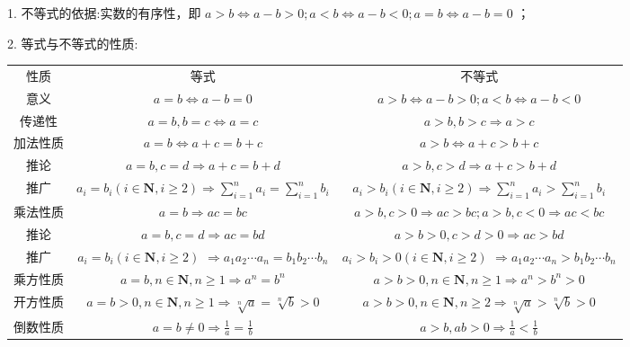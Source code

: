1. 不等式的依据:实数的有序性，即 $a > b \Leftrightarrow  a - b > 0;a < b \Leftrightarrow  a - b < 0;a = b \Leftrightarrow  a - b = 0$ ；

2. 等式与不等式的性质:

\begin{center}
\begin{tabular}{|c|c|c|}
\hline
性质 & 等式 & 不等式 \\
\cline{1-3}
意义 & $a = b \Leftrightarrow  a - b = 0$ & $a > b \Leftrightarrow  a - b > 0;a < b \Leftrightarrow  a - b < 0$ \\
\cline{1-3}
传递性 & $a = b,b = c \Leftrightarrow  a = c$ & $a > b,b > c \Rightarrow  a > c$ \\
\cline{1-3}
加法性质 & $a = b \Leftrightarrow  a + c = b + c$ & $a > b \Leftrightarrow  a + c > b + c$ \\
\cline{1-3}
推论 & $a = b,c = d \Rightarrow  a + c = b + d$ & $a > b,c > d \Rightarrow  a + c > b + d$ \\
\cline{1-3}
推广 & ${a}_{i} = {b}_{i}\left( {i \in  \mathbf{N},i \geq  2}\right)  \Rightarrow  \mathop{\sum }\limits_{{i = 1}}^{n}{a}_{i} = \mathop{\sum }\limits_{{i = 1}}^{n}{b}_{i}$ & ${a}_{i} > {b}_{i}\left( {i \in  \mathbf{N},i \geq  2}\right)  \Rightarrow  \mathop{\sum }\limits_{{i = 1}}^{n}{a}_{i} > \mathop{\sum }\limits_{{i = 1}}^{n}{b}_{i}$ \\
\cline{1-3}
乘法性质 & $a = b \Rightarrow  {ac} = {bc}$ & $a > b,c > 0 \Rightarrow  {ac} > {bc};a > b,c < 0 \Rightarrow  {ac} < {bc}$ \\
\cline{1-3}
推论 & $a = b,c = d \Rightarrow  {ac} = {bd}$ & $a > b > 0,c > d > 0 \Rightarrow  {ac} > {bd}$ \\
\cline{1-3}
推广 & \makecell{ ${a}_{i} = {b}_{i}\left( {i \in  \mathbf{N},i \geq  2}\right)$ \\ $\Rightarrow  {a}_{1}{a}_{2}\cdots {a}_{n} = {b}_{1}{b}_{2}\cdots {b}_{n}$ } & \makecell{ ${a}_{i} > {b}_{i} > 0\left( {i \in  \mathbf{N},i \geq  2}\right)$ \\ $\Rightarrow  {a}_{1}{a}_{2}\cdots {a}_{n} > {b}_{1}{b}_{2}\cdots {b}_{n}$ } \\
\cline{1-3}
乘方性质 & $a = b,n \in  \mathbf{N},n \geq  1 \Rightarrow  {a}^{n} = {b}^{n}$ & $a > b > 0,n \in  \mathbf{N},n \geq  1 \Rightarrow  {a}^{n} > {b}^{n} > 0$ \\
\cline{1-3}
开方性质 & $a = b > 0,n \in  \mathbf{N},n \geq  1 \Rightarrow  \sqrt[n]{a} = \sqrt[n]{b} > 0$ & $a > b > 0,n \in  \mathbf{N},n \geq  2 \Rightarrow  \sqrt[n]{a} > \sqrt[n]{b} > 0$ \\
\cline{1-3}
倒数性质 & $a = b \neq  0 \Rightarrow  \frac{1}{a} = \frac{1}{b}$ & $a > b,{ab} > 0 \Rightarrow  \frac{1}{a} < \frac{1}{b}$ \\
\cline{1-3}
\hline
\end{tabular}
\end{center}

